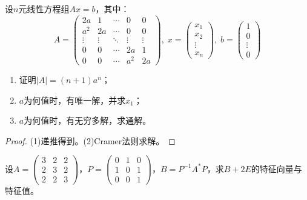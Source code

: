 \begin{theorem}
	设$n$元线性方程组$Ax=b$，其中：
	\begin{equation*}
		A=
		\begin{pmatrix}
			2a & 1 & \cdots & 0 & 0 \\
			a^2 & 2a & \cdots & 0 & 0 \\
			\vdots & \vdots & \ddots & \vdots & \vdots \\
			0 & 0 & \cdots & 2a & 1 \\
			0 & 0 & \cdots & a^2 & 2a
		\end{pmatrix},\;
		x=
		\begin{pmatrix}
			x_1 \\
			x_2 \\
			\vdots \\
			x_n
		\end{pmatrix},\;
		b=
		\begin{pmatrix}
			1 \\
			0 \\
			\vdots \\
			0
		\end{pmatrix}
	\end{equation*}
	\begin{enumerate}
		\item 证明$|A|=(n+1)a^n$；
		\item $a$为何值时，有唯一解，并求$x_1$；
		\item $a$为何值时，有无穷多解，求通解。
	\end{enumerate}
\end{theorem}
\begin{proof}
	(1)递推得到。(2)Cramer法则求解。
\end{proof}

\begin{theorem}
	设$A=\begin{pmatrix}
		3 & 2 & 2 \\
		2 & 3 & 2 \\
		2 & 2 & 3
	\end{pmatrix}$，$P=
	\begin{pmatrix}
	0 & 1 & 0 \\
	1 & 0 & 1 \\
	0 & 0 & 1
	\end{pmatrix}$，$B=P^{-1}A^*P$，求$B+2E$的特征向量与特征值。
\end{theorem}

